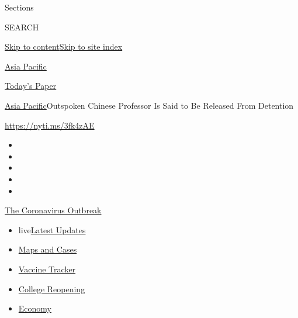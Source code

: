 Sections

SEARCH

\protect\hyperlink{site-content}{Skip to
content}\protect\hyperlink{site-index}{Skip to site index}

\href{https://www.nytimes.com/section/world/asia}{Asia Pacific}

\href{https://myaccount.nytimes.com/auth/login?response_type=cookie\&client_id=vi}{}

\href{https://www.nytimes.com/section/todayspaper}{Today's Paper}

\href{/section/world/asia}{Asia Pacific}\textbar{}Outspoken Chinese
Professor Is Said to Be Released From Detention

\url{https://nyti.ms/3fk4zAE}

\begin{itemize}
\item
\item
\item
\item
\item
\end{itemize}

\href{https://www.nytimes.com/news-event/coronavirus?action=click\&pgtype=Article\&state=default\&region=TOP_BANNER\&context=storylines_menu}{The
Coronavirus Outbreak}

\begin{itemize}
\tightlist
\item
  live\href{https://www.nytimes.com/2020/08/03/world/coronavirus-covid-19.html?action=click\&pgtype=Article\&state=default\&region=TOP_BANNER\&context=storylines_menu}{Latest
  Updates}
\item
  \href{https://www.nytimes.com/interactive/2020/us/coronavirus-us-cases.html?action=click\&pgtype=Article\&state=default\&region=TOP_BANNER\&context=storylines_menu}{Maps
  and Cases}
\item
  \href{https://www.nytimes.com/interactive/2020/science/coronavirus-vaccine-tracker.html?action=click\&pgtype=Article\&state=default\&region=TOP_BANNER\&context=storylines_menu}{Vaccine
  Tracker}
\item
  \href{https://www.nytimes.com/2020/08/02/us/covid-college-reopening.html?action=click\&pgtype=Article\&state=default\&region=TOP_BANNER\&context=storylines_menu}{College
  Reopening}
\item
  \href{https://www.nytimes.com/live/2020/08/03/business/stock-market-today-coronavirus?action=click\&pgtype=Article\&state=default\&region=TOP_BANNER\&context=storylines_menu}{Economy}
\end{itemize}

